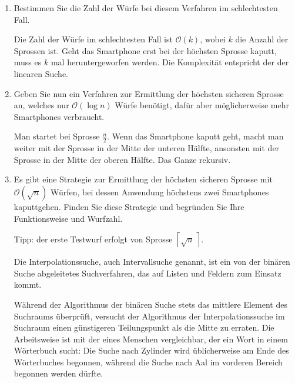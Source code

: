 \documentclass{lehramt-informatik-aufgabe}
\begin{document}
\begin{enumerate}


\item Bestimmen Sie die Zahl der Würfe bei diesem Verfahren im
schlechtesten Fall.

\begin{liAntwort}
Die Zahl der Würfe im schlechtesten Fall ist $\mathcal{O} (k)$, wobei
$k$ die Anzahl der Sprossen ist. Geht das Smartphone erst bei der
höchsten Sprosse kaputt, muss es $k$ mal heruntergeworfen werden. Die
Komplexität entspricht der der linearen Suche.
\end{liAntwort}


\item Geben Sie nun ein Verfahren zur Ermittlung der höchsten sicheren
Sprosse an, welches nur $\mathcal{O}(\log n)$ Würfe benötigt, dafür
aber möglicherweise mehr Smartphones verbraucht.

\begin{liAntwort}
Man startet bei Sprosse $\frac{n}{2}$. Wenn das Smartphone kaputt geht,
macht man weiter mit der Sprosse in der Mitte der unteren Hälfte,
ansonsten mit der Sprosse in der Mitte der oberen Hälfte. Das Ganze
rekursiv.
\end{liAntwort}


\item Es gibt eine Strategie zur Ermittlung der höchsten sicheren
Sprosse mit $\mathcal{O}\left(\sqrt{n}\right)$ Würfen, bei dessen Anwendung
höchstens zwei Smartphones kaputtgehen. Finden Sie diese Strategie und
begründen Sie Ihre Funktionsweise und Wurfzahl.

Tipp: der erste Testwurf erfolgt von Sprosse $\left\lceil\sqrt{n}\,\right\rceil$.

\begin{liExkurs}[Interpolationssuche]
Die Interpolationssuche, auch Intervallsuche genannt, ist ein von der
binären Suche abgeleitetes Suchverfahren, das auf Listen und Feldern zum
Einsatz kommt.

Während der Algorithmus der binären Suche stets das mittlere Element des
Suchraums überprüft, versucht der Algorithmus der Interpolationssuche im
Suchraum einen günstigeren Teilungspunkt als die Mitte zu erraten. Die
Arbeitsweise ist mit der eines Menschen vergleichbar, der ein Wort in
einem Wörterbuch sucht: Die Suche nach Zylinder wird üblicherweise am
Ende des Wörterbuches begonnen, während die Suche nach Aal im vorderen
Bereich begonnen werden dürfte.
\end{liExkurs}


\end{enumerate}
\end{document}
